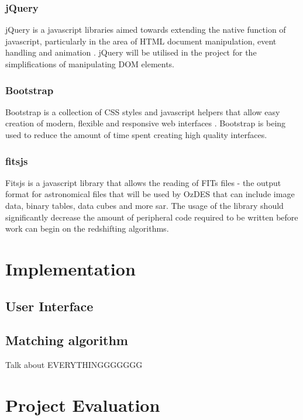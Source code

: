 \documentclass[titlesmallcaps, examinerscopy, copyrightpage]{uqthesis}
\begin{document}
\subsection{jQuery}

jQuery is a javascript libraries aimed towards extending the native function of javascript, particularly in the area of HTML document manipulation, event handling and animation \cite{jQuery}. jQuery will be utilised in the project for the simplifications of manipulating DOM elements.

\subsection{Bootstrap}

Bootstrap is a collection of CSS styles and javascript helpers that allow easy creation of modern, flexible and responsive web interfaces \cite{bootstrap}. Bootstrap is being used to reduce the amount of time spent creating high quality interfaces.


\subsection{fitsjs}

Fitsjs is a javascript library that allows the reading of FITs files - the output format for astronomical files that will be used by OzDES that can include image data, binary tables, data cubes and more \cite{fitsjs}sar. The usage of the library should significantly decrease the amount of peripheral code required to be written before work can begin on the redshifting algorithms.


\chapter{Implementation}
\label{ch:impl}


\section{User Interface}


\section{Matching algorithm}


Talk about EVERYTHINGGGGGGG



\chapter{Project Evaluation}
\end{document}
